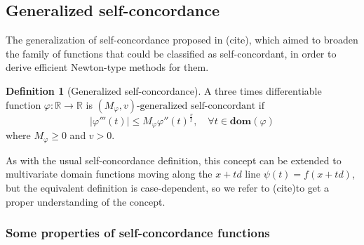 \documentclass[11pt]{article}
\theoremstyle{definition}
\newtheorem{definition}{Definition}[section]
\theoremstyle{remark}
\theoremstyle{plain}
\theoremstyle{definition}
\newcommand{\R}{\mathbb{R}}
\newcommand{\1}{\mathbf{1}}
\newcommand{\citeReq}{{\color{red} (cite)}}
\renewcommand{\R}{\mathbb{R}}
\begin{document}
\subsection{Generalized self-concordance}


The generalization of self-concordance proposed in \citeReq, which aimed to broaden the family of functions that could be classified as self-concordant, in order to derive efficient Newton-type methods for them. 


\begin{definition}[Generalized self-concordance]
    A three times differentiable function $\varphi:\R \rightarrow \R$ is $(M_\varphi,v)\text{-generalized self-concordant if}$ \begin{equation}
        |\varphi'''(t)|\leq M_\varphi \varphi''(t)^{\frac{v}{2}}, \quad  \forall t \in \textbf{dom}(\varphi)
    \end{equation}
    where $M_\varphi\geq 0$ and $v>0$.
\end{definition}
As with the usual self-concordance definition, this concept can be extended to multivariate domain functions moving along the $x+td$ line $\psi(t)=f(x + td)$, but the equivalent definition is case-dependent, so we refer to \citeReq to get a proper understanding of the concept.


\subsubsection{Some properties of self-concordance functions}
\end{document}
